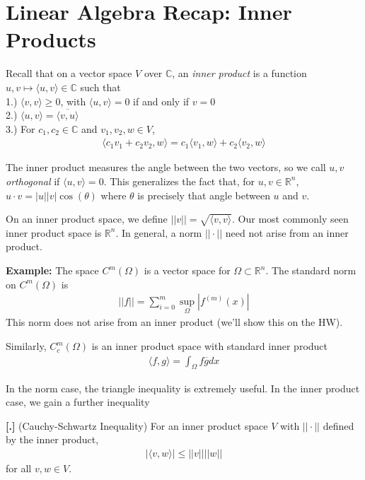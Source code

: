 \documentclass{article}
\newcommand{\R}{{\mathbb{R}}}
\newcommand{\C}{{\mathbb{C}}}
\newcommand{ \norm }[1]{{ || {#1}||}}
\newcounter{result}[section]
\newenvironment{res}[1][]{\refstepcounter{result}\par\medskip
	\noindent \textbf{[\thesection.\theresult] #1} \rmfamily}{\medskip}
\begin{document}
	
	
	\section{Linear Algebra Recap: Inner Products}
	
	Recall that on a vector space $V$ over $\C$, an \textit{inner product} is a function $u,v \mapsto \langle u,v \rangle \in \C$ such that \\
	1.) $\langle v,v \rangle \geq 0$, with $\langle u,v \rangle = 0$ if and only if $v = 0$ \\
	2.) $\langle u,v\rangle  = \overline{\langle v,u\rangle }$ \\
	3.) For $c_{1},c_{2} \in \C$ and $v_{1},v_{2},w \in V$,
	\begin{align*}
		\langle c_{1}v_{1} + c_{2}v_{2},w\rangle  = c_{1}\langle v_1,w\rangle  + c_{2}\langle v_{2},w\rangle 
	\end{align*}
	
	\vspace{0.25 cm}
	
	The inner product measures the angle between the two vectors, so we call $u,v$ \textit{orthogonal} if $\langle u,v\rangle  = 0$. This generalizes the fact that, for $u,v \in \R^{n}$, $u \cdot v = |u||v| \cos(\theta)$ where $\theta$ is precisely that angle between $u$ and $v$. 
	
	On an inner product space, we define $\norm{v} = \sqrt{\langle v,v\rangle }$. Our most commonly seen inner product space is $\R^{n}$. In general, a norm $\norm{\cdot}$ need not arise from an inner product. 
	
	\vspace{0.25 cm}
	\textbf{Example:} 
	The space $C^{m}(\Omega)$ is a vector space for $\Omega \subset \R^{n}$. The standard norm on $C^{m}(\Omega)$ is 
	\begin{align*}
		\norm{f} = \sum_{i=0}^{m} \sup_{\Omega} |f^{(m)}(x)|
	\end{align*}
	This norm does not arise from an inner product (we'll show this on the HW). 
	
	Similarly, $C_{c}^{m}(\Omega)$ is an inner product space with standard inner product 
	\begin{align*}
		\langle f,g\rangle = \int_{\Omega} f \overline{g} dx
	\end{align*}
	
	\vspace{0.25 cm}
	
	In the norm case, the triangle inequality is extremely useful. In the inner product case, we gain a further inequality
	\begin{res}
		(Cauchy-Schwartz Inequality) For an inner product space $V$ with $\norm{\cdot}$ defined by the inner product, 
		\begin{align*}
			|\langle v,w\rangle | \leq \norm{v} \norm{w}
		\end{align*}
		for all $v,w \in V$. 
	\end{res}
	
\end{document}
